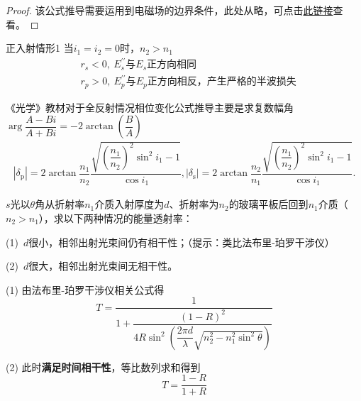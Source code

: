 \begin{proof}
	该公式推导需要运用到电磁场的边界条件，此处从略，可点击\href{https://zhuanlan.zhihu.com/p/520141099}{此链接}查看。
\end{proof}


\begin{myprop}{ 正入射情形}{1}
	当$i_1=i_2=0$时，$n_2>n_1$
	\[
		\begin{aligned}
			&r_s<0,\ E_{s}^{\prime\prime}\text{与}E_{s}\text{正方向相同}\\
			&r_p>0,\ E_{p}^{\prime \prime}\text{与}E_{p}\text{正方向相反，产生严格的半波损失}
		\end{aligned}
	\]
\end{myprop}

\begin{remark}
	《光学》教材对于全反射情况相位变化公式推导主要是求复数幅角$\arg\dfrac{A-Bi}{A+Bi}=-2\arctan\left(\dfrac{B}{A}\right)$
	\[
	\begin{array}{l}|\delta_{\mathrm{p}}|=2 \arctan \dfrac{n_1}{n_2} \dfrac{\sqrt{\left(\dfrac{n_1}{n_2}\right)^2 \sin ^2 i_1-1}}{\cos i_1}, |\delta_{\mathrm{s}}|=2 \arctan \dfrac{n_2}{n_1} \dfrac{\sqrt{\left(\dfrac{n_1}{n_2}\right)^2 \sin ^2 i_1-1}}{\cos i_1} .\end{array}
	\]
\end{remark}

\begin{example}
	$s$光以$\theta$角从折射率$n_1$介质入射厚度为$d$、折射率为$n_2$的玻璃平板后回到$n_1$介质（$n_2>n_1$），求以下两种情况的能量透射率：
	\par (1)\ $d$很小，相邻出射光束间仍有相干性；（提示：类比法布里-珀罗干涉仪）
	\par (2)\ $d$很大，相邻出射光束间无相干性。
	\soln

	\par (1) 由法布里-珀罗干涉仪相关公式得
	\[
		T=\dfrac{1}{1+\dfrac{(1-R)^2}{4R\sin ^2\left(\dfrac{2\pi d}{\lambda}\sqrt{n_2^2-n_1^2\sin ^2\theta}\right)}}
	\]
	\par (2) 此时\textbf{满足时间相干性}，等比数列求和得到
	\[
		T=\dfrac{1-R}{1+R}	
	\]
\end{example}


